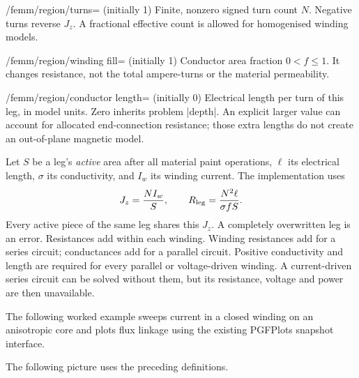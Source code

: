 \begin{key}{/femm/region/turns= (initially 1)}
Finite, nonzero signed turn count $N$. Negative turns reverse $J_z$.
A fractional effective count is allowed for homogenised winding models.
\end{key}
\begin{key}{/femm/region/winding fill= (initially 1)}
Conductor area fraction $0<f\leq1$. It changes resistance, not the total
ampere-turns or the material permeability.
\end{key}
\begin{key}{/femm/region/conductor length= (initially 0)}
Electrical length per turn of this leg, in model units. Zero inherits problem
|depth|. An explicit larger value can account for allocated end-connection
resistance; those extra lengths do not create an out-of-plane magnetic model.
\end{key}

Let $S$ be a leg's \emph{active} area after all material paint operations, $\ell$
its electrical length, $\sigma$ its conductivity, and $I_w$ its winding current.
The implementation uses
\[
 J_z=\frac{NI_w}{S},\qquad
 R_{\rm leg}=\frac{N^2\ell}{\sigma fS}.
\]
Every active piece of the same leg shares this $J_z$. A completely overwritten
leg is an error. Resistances add within each winding. Winding resistances add
for a series circuit; conductances add for a parallel circuit. Positive
conductivity and length are required for every parallel or voltage-driven
winding. A current-driven series circuit can be solved without them, but its
resistance, voltage and power are then unavailable.

The following worked example sweeps current in a closed winding on an anisotropic
core and plots flux linkage using the existing PGFPlots snapshot interface.


\begin{codeexample}
\end{codeexample}

The following picture uses the preceding definitions.


